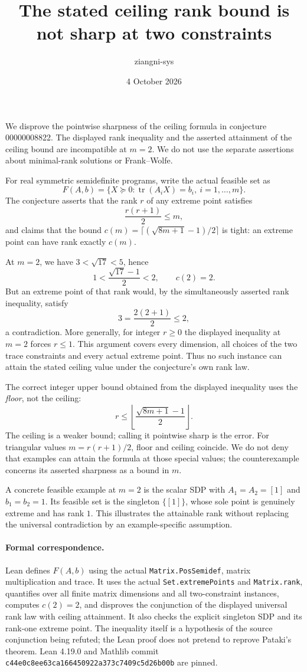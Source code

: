 \documentclass[11pt]{article}
\title{The stated ceiling rank bound is not sharp at two constraints}
\author{ziangni-sys}
\date{4 October 2026}
\begin{document}
\maketitle
We disprove the pointwise sharpness of the ceiling formula in conjecture
00000008822. The displayed rank inequality and the asserted attainment
of the ceiling bound are incompatible at $m=2$. We do not use the
separate assertions about minimal-rank solutions or Frank--Wolfe.

For real symmetric semidefinite programs, write the actual feasible set as
\[
F(A,b)=\{X\succeq0:\operatorname{tr}(A_iX)=b_i,
\ i=1,\ldots,m\}.
\]
The conjecture asserts that the rank $r$ of any extreme point satisfies
\[
\frac{r(r+1)}2\le m,
\]
and claims that the bound
$c(m)=\lceil(\sqrt{8m+1}-1)/2\rceil$ is tight: an extreme point can
have rank exactly $c(m)$.

At $m=2$, we have $3<\sqrt{17}<5$, hence
\[
1<\frac{\sqrt{17}-1}{2}<2,\qquad c(2)=2.
\]
But an extreme point of that rank would, by the simultaneously asserted
rank inequality, satisfy
\[
3=\frac{2(2+1)}2\le2,
\]
a contradiction. More generally, for integer $r\ge0$ the displayed
inequality at $m=2$ forces $r\le1$. This argument covers every dimension,
all choices of the two trace constraints and every actual extreme point.
Thus no such instance can attain the stated ceiling value under the
conjecture's own rank law.

The correct integer upper bound obtained from the displayed inequality
uses the \emph{floor}, not the ceiling:
\[
r\le\left\lfloor\frac{\sqrt{8m+1}-1}{2}\right\rfloor.
\]
The ceiling is a weaker bound; calling it pointwise sharp is the error.
For triangular values $m=r(r+1)/2$, floor and ceiling coincide. We do
not deny that examples can attain the formula at those special values;
the counterexample concerns its asserted sharpness as a bound in $m$.

A concrete feasible example at $m=2$ is the scalar SDP with
$A_1=A_2=[1]$ and $b_1=b_2=1$. Its feasible set is the singleton
$\{[1]\}$, whose sole point is genuinely extreme and has rank $1$.
This illustrates the attainable rank without replacing the universal
contradiction by an example-specific assumption.

\paragraph{Formal correspondence.}
Lean defines $F(A,b)$ using the actual \texttt{Matrix.PosSemidef},
matrix multiplication and trace. It uses the actual
\texttt{Set.extremePoints} and \texttt{Matrix.rank}, quantifies over
all finite matrix dimensions and all two-constraint instances, computes
$c(2)=2$, and disproves the conjunction of the displayed universal rank
law with ceiling attainment. It also checks the explicit singleton SDP
and its rank-one extreme point. The inequality itself is a hypothesis
of the source conjunction being refuted; the Lean proof does not pretend
to reprove Pataki's theorem. Lean 4.19.0 and Mathlib commit
\texttt{c44e0c8ee63ca166450922a373c7409c5d26b00b} are pinned.
\end{document}
